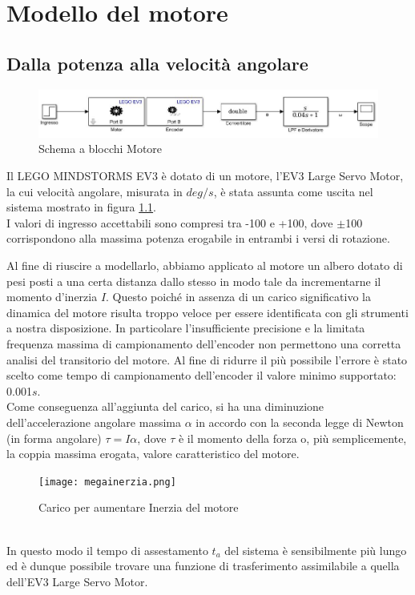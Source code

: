 \chapter{Modello del motore}\label{modMotor}
\section{Dalla potenza alla velocità angolare}
\begin{figure}[ht]
	\centering
	\includegraphics[width=\textwidth]{motoreSimulink.jpg}
	\caption{Schema a blocchi Motore}
	\label{motoreSimulink}
\end{figure}
\noindent Il LEGO MINDSTORMS EV3 è dotato di un motore, l'EV3 Large Servo Motor, la cui velocità angolare, misurata in $deg/s$, è stata assunta come uscita nel sistema mostrato in figura \ref{motoreSimulink}.\\
I valori di ingresso accettabili sono compresi tra -100 e +100, dove $\pm$100 corrispondono alla massima potenza erogabile in entrambi i versi di rotazione.

Al fine di riuscire a modellarlo, abbiamo applicato al motore un albero dotato di pesi posti a una certa distanza dallo stesso in modo tale da incrementarne il momento d'inerzia $I$. Questo poiché in assenza di un carico significativo la dinamica del motore risulta  troppo veloce per  essere identificata con gli strumenti a nostra disposizione. In particolare l'insufficiente precisione e la limitata frequenza massima di campionamento dell'encoder non permettono una corretta analisi del transitorio del motore. Al fine di ridurre il più possibile l'errore è stato scelto come tempo di campionamento dell'encoder il valore minimo supportato: 0.001$s$.\\
Come conseguenza all'aggiunta del carico, si ha una diminuzione dell'accelerazione angolare massima $\alpha$ in accordo con la seconda legge di Newton (in forma angolare) $\tau = I\alpha$, dove $\tau$ è il momento della forza o, più semplicemente, la coppia massima erogata, valore caratteristico del motore.
\begin{figure}[ht]
	\centering
	\texttt{[image: megainerzia.png]}
	\caption{Carico per aumentare Inerzia del motore}
	\label{megainerzia}
\end{figure}
\\In questo modo il tempo di assestamento $t_a$ del sistema è sensibilmente più lungo ed è dunque possibile trovare una funzione di trasferimento assimilabile a quella dell'EV3 Large Servo Motor.

